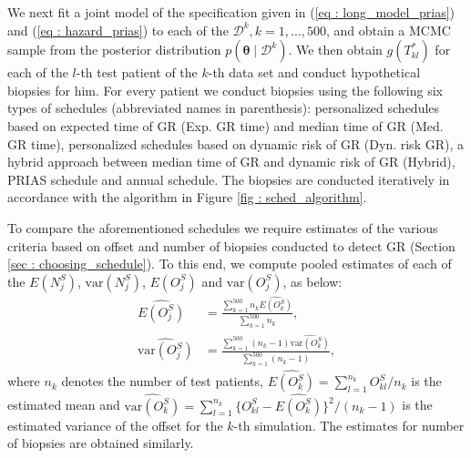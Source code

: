 We next fit a joint model of the specification given in (\ref{eq : long_model_prias}) and (\ref{eq : hazard_prias}) to each of the $\mathcal{D}^k, k=1, \ldots, 500$, and obtain a MCMC sample from the posterior distribution $p(\boldsymbol{\theta} \mid \mathcal{D}^k)$. We then obtain $g(T^*_{kl})$ for each of the $l$-th test patient of the $k$-th data set and conduct hypothetical biopsies for him. For every patient we conduct biopsies using the following six types of schedules (abbreviated names in parenthesis): personalized schedules based on expected time of GR (Exp. GR time) and median time of GR (Med. GR time), personalized schedules based on dynamic risk of GR (Dyn. risk GR), a hybrid approach between median time of GR and dynamic risk of GR (Hybrid), PRIAS schedule and annual schedule. The biopsies are conducted iteratively in accordance with the algorithm in Figure \ref{fig : sched_algorithm}. 

To compare the aforementioned schedules we require estimates of the various criteria based on offset and number of biopsies conducted to detect GR (Section \ref{sec : choosing_schedule}). To this end, we compute pooled estimates of each of the $E(N^S_j)$, $\mbox{var}(N^S_j)$, $E(O^S_j)$ and $\mbox{var}(O^S_j)$, as below:
\begin{align*}
\widehat{E(O^S_j)} &= \frac{\sum_{k=1}^{500} n_k \widehat{E(O^S_k)}}{\sum_{k=1}^{500} n_k}, \\
\widehat{\mbox{var}(O^S_j)} &= \frac{\sum_{k=1}^{500} (n_k - 1) \widehat{\mbox{var}(O^S_k)}}{\sum_{k=1}^{500} (n_k-1)}, 
\end{align*}
where $n_k$ denotes the number of test patients, $\widehat{E(O^S_k)} = {\sum_{l=1}^{n_k}O^S_{kl}}/{n_k}$ is the estimated mean and $\widehat{\mbox{var}(O^S_k)} = {\sum_{l=1}^{n_k}\big\{O^S_{kl} - \widehat{E(O^S_k)}\big\}^2}/(n_k-1)$ is the estimated variance of the offset for the $k$-th simulation. The estimates for number of biopsies are obtained similarly.

